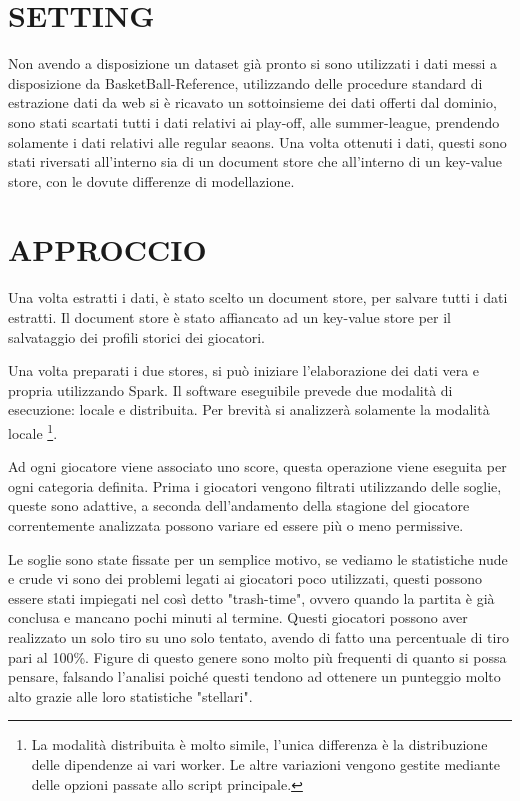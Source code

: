 \documentclass[10pt,a4paper,twocolumn]{article}
\begin{document}
\section{SETTING}

Non avendo a disposizione un dataset già pronto si sono utilizzati i dati messi a disposizione da BasketBall-Reference, utilizzando delle procedure standard di estrazione dati da web si è ricavato un sottoinsieme dei dati offerti dal dominio, sono stati scartati tutti i dati relativi ai play-off, alle summer-league, prendendo solamente i dati relativi alle regular seaons. Una volta ottenuti i dati, questi sono stati riversati all'interno sia di un document store che all'interno di un key-value store, con le dovute differenze di modellazione.

\section{APPROCCIO}

Una volta estratti i dati, è stato scelto un document store, per salvare tutti i dati estratti. Il document store è stato affiancato ad un key-value store per il salvataggio dei profili storici dei giocatori.

Una volta preparati i due stores, si può iniziare l'elaborazione dei dati vera e propria utilizzando Spark. Il software eseguibile prevede due modalità di esecuzione: locale e distribuita. Per brevità si analizzerà solamente la modalità locale \footnote{La modalità distribuita è molto simile, l'unica differenza è la distribuzione delle dipendenze ai vari worker. Le altre variazioni vengono gestite mediante delle opzioni passate allo script principale.}.

Ad ogni giocatore viene associato uno score, questa operazione viene eseguita per ogni categoria definita. Prima i giocatori vengono filtrati utilizzando delle soglie, queste sono adattive, a seconda dell'andamento della stagione del giocatore correntemente analizzata possono variare ed essere più o meno permissive. 

Le soglie sono state fissate per un semplice motivo, se vediamo le statistiche nude e crude vi sono dei problemi legati ai giocatori poco utilizzati, questi possono essere stati impiegati nel così detto "trash-time", ovvero quando la partita è già conclusa e mancano pochi minuti al termine. Questi giocatori possono aver realizzato un solo tiro su uno solo tentato, avendo di fatto una percentuale di tiro pari al 100\%. Figure di questo genere sono molto più frequenti di quanto si possa pensare, falsando l'analisi poiché questi tendono ad ottenere un punteggio molto alto grazie alle loro statistiche "stellari".
\end{document}
